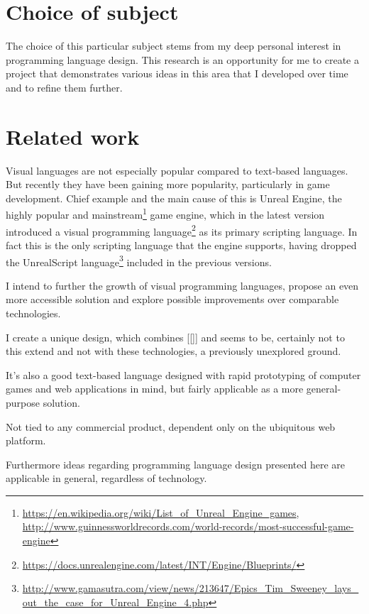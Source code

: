\section{Choice of subject}
The choice of this particular subject stems from my deep personal interest in programming language design. This research is an opportunity for me to create a project that demonstrates various ideas in this area that I developed over time and to refine them further.


\section{Related work}
Visual languages are not especially popular compared to text-based languages. But recently they have been gaining more popularity, particularly in game development. Chief example and the main cause of this is Unreal Engine, the highly popular and mainstream\footnote{\url{https://en.wikipedia.org/wiki/List_of_Unreal_Engine_games}, \url{http://www.guinnessworldrecords.com/world-records/most-successful-game-engine}} game engine, which in the latest version introduced a visual programming language\footnote{\url{https://docs.unrealengine.com/latest/INT/Engine/Blueprints/}} as its primary scripting language. In fact this is the only scripting language that the engine supports, having dropped the UnrealScript language\footnote{\url{http://www.gamasutra.com/view/news/213647/Epics_Tim_Sweeney_lays_out_the_case_for_Unreal_Engine_4.php}} included in the previous versions. 

I intend to further the growth of visual programming languages, propose an even more accessible solution and explore possible improvements over comparable technologies.

I create a unique design, which combines [[]] and seems to be, certainly not to this extend and not with these technologies, a previously unexplored ground.

It's also a good text-based language designed with rapid prototyping of computer games and web applications in mind, but fairly applicable as a more general-purpose solution.

Not tied to any commercial product, dependent only on the ubiquitous web platform.

Furthermore ideas regarding programming language design presented here are applicable in general, regardless of technology.

